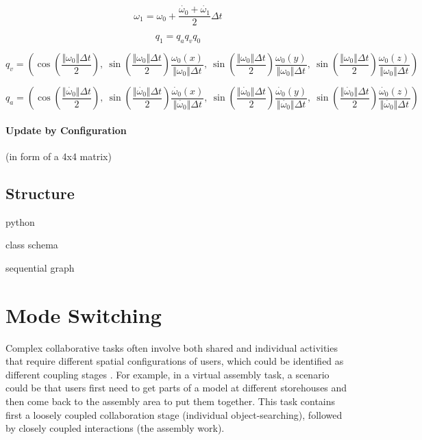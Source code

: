 \[
\omega_{1}=\omega_{0}+\frac{\dot{\omega_{0}}+\dot{\omega_{1}}}{2}\Delta t
\]

\[
q_{1}=q_{a}q_{v}q_{0}
\]

\[
q_{v}=\left(\cos(\frac{\Vert\omega_{0}\Vert\Delta t}{2}),\:\sin(\frac{\Vert\omega_{0}\Vert\Delta t}{2})\frac{\omega_{0}(x)}{\Vert\omega_{0}\Vert\Delta t},\:\sin(\frac{\Vert\omega_{0}\Vert\Delta t}{2})\frac{\omega_{0}(y)}{\Vert\omega_{0}\Vert\Delta t},\:\sin(\frac{\Vert\omega_{0}\Vert\Delta t}{2})\frac{\omega_{0}(z)}{\Vert\omega_{0}\Vert\Delta t}\right)
\]

\[
q_{a}=\left(\cos(\frac{\Vert\dot{\omega_{0}}\Vert\Delta t}{2}),\:\sin(\frac{\Vert\dot{\omega_{0}}\Vert\Delta t}{2})\frac{\dot{\omega_{0}}(x)}{\Vert\dot{\omega_{0}}\Vert\Delta t},\:\sin(\frac{\Vert\dot{\omega_{0}}\Vert\Delta t}{2})\frac{\dot{\omega_{0}}(y)}{\Vert\dot{\omega_{0}}\Vert\Delta t},\:\sin(\frac{\Vert\dot{\omega_{0}}\Vert\Delta t}{2})\frac{\dot{\omega_{0}}(z)}{\Vert\dot{\omega_{0}}\Vert\Delta t}\right)
\]


\paragraph{Update by Configuration}
(in form of a 4x4 matrix)



\subsection{Structure}

python

class schema

sequential graph


\section{Mode Switching}
Complex collaborative tasks often involve both shared and individual activities that require different spatial configurations of users, which could be identified as different coupling stages \citep{Lissermann2014PMC}. For example, in a virtual assembly task, a scenario could be that users first need to get parts of a model at different storehouses and then come back to the assembly area to put them together. This task contains first a loosely coupled collaboration stage (individual object-searching), followed by closely coupled interactions (the assembly work). 

